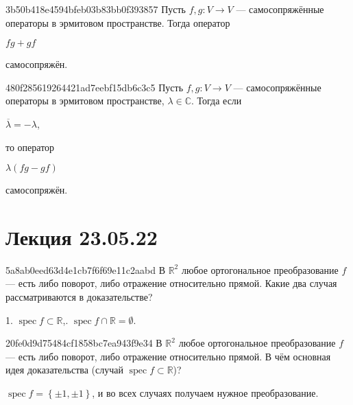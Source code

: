 \begin{note}{3b50b418e4594bfeb03b83bb0f393857}
    Пусть \({ f, g : V \to V }\) --- самосопряжённые операторы в эрмитовом пространстве.
    Тогда оператор \begin{icloze}{2}\({ fg + gf }\)\end{icloze} \begin{icloze}{1}самосопряжён.\end{icloze}
\end{note}

\begin{note}{480f285619264421ad7eebf15db6c3c5}
    Пусть \({ f, g : V \to V }\) --- самосопряжённые операторы в эрмитовом пространстве,\: \({ \lambda \in \mathbb C }\).
    Тогда если \begin{icloze}{2}\({ \overline{\lambda} = -\lambda }\),\end{icloze} то оператор \begin{icloze}{3}\({ \lambda(fg - gf) }\)\end{icloze} \begin{icloze}{1}самосопряжён.\end{icloze}
\end{note}

\section{Лекция 23.05.22}
\begin{note}{5a8ab0eed63d4e1cb7f6f69e11c2aabd}
    В \({ \mathbb R^2 }\) любое ортогональное преобразование \({ f }\) --- есть либо поворот, либо отражение относительно прямой.
    Какие  два случая рассматриваются в доказательстве?

    \begin{cloze}{1}
        1. \({ \operatorname{spec} f \subset  \mathbb R }\),. \({ \operatorname{spec} f \cap \mathbb R = \emptyset }\).
    \end{cloze}
\end{note}

\begin{note}{20fe0d9d75484cf1858bc7ea943f9e34}
    В \({ \mathbb R^2 }\) любое ортогональное преобразование \({ f }\) --- есть либо поворот, либо отражение относительно прямой.
    В чём основная идея доказательства (случай \({ \operatorname{spec} f \subset \mathbb R }\))?

    \begin{cloze}{1}
        \({ \operatorname{spec} f = \left\{ \pm 1, \pm 1 \right\} }\), и во всех случаях получаем нужное преобразование.
    \end{cloze}
\end{note}

